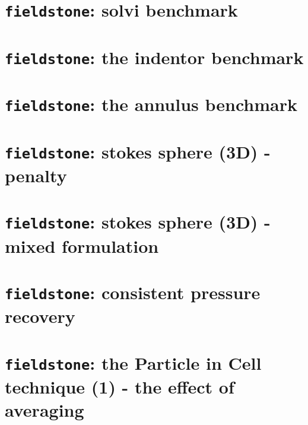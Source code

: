\documentclass[a4paper]{article}
\begin{document}
\newpage
\section{{\tt fieldstone}: solvi benchmark}


\newpage
\section{{\tt fieldstone}: the indentor benchmark}


\newpage
\section{{\tt fieldstone}: the annulus benchmark}



\newpage
\section{{\tt fieldstone}: stokes sphere (3D) - penalty\label{f5}}


\newpage
\section{{\tt fieldstone}: stokes sphere (3D) - mixed formulation\label{f5}}


\newpage
\section{{\tt fieldstone}: consistent pressure recovery }


\newpage
\section{{\tt fieldstone}: the Particle in Cell technique (1) - the effect of averaging}

\end{document}
